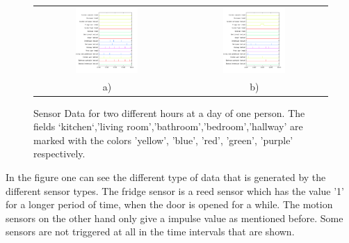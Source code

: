 \begin{figure}[h!]
   \centering
   \begin{tabular}{c c}
    \includegraphics[width=0.45\textwidth]{Pictures/SensorsMorningHN3Day34.png} & \includegraphics[width=0.45\textwidth]{Pictures/SensorsNoonHN3Day34.png}\\
    a) & b)
   \end{tabular}
   \caption{Sensor Data for two different hours at a day of one person. The fields `kitchen`,'living room','bathroom','bedroom','hallway' are marked with the colors 'yellow', 'blue', 'red', 'green', 'purple' respectively.}
   \label{fig:PlaineSensorData}
 \end{figure}


   

In the figure one can see the different type of data that is generated by the different sensor types. The fridge sensor is a reed sensor which has the value '1' for a longer period of time, when the door is opened for a while. The motion sensors on the other hand only give a impulse value as mentioned before. Some sensors are not triggered at all in the time intervals that are shown.

